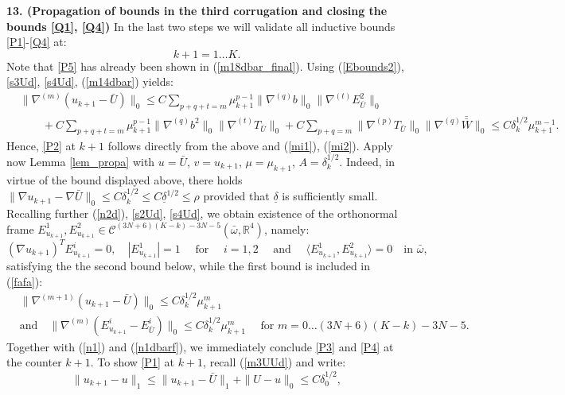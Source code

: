 \documentclass[reqno,twoside,11pt]{amsart}
\newcommand{\R}{\mathbb{R}}
\newcommand*{\dbar}[1]{\bar{\bar{#1}}}
\numberwithin{equation}{section}
\theoremstyle{plain}
\theoremstyle{definition}
\begin{document}
\smallskip

{\bf 13. (Propagation of bounds in the third corrugation and 
closing the bounds \ref{Q1}, \ref{Q4})}
In the last two steps we will validate all inductive
bounds \ref{P1}-\ref{Q4} at:
$$k+1=1\ldots K.$$
Note that \ref{P5} has already been shown in (\ref{m18dbar_final}).
Using (\ref{Ebounds2}), \ref{s3Ud}, \ref{s4Ud},
(\ref{m14dbar}) yields:
\begin{equation}\label{fafa}
\begin{split} 
& \|\nabla^{(m)} (u_{k+1}-\bar U)\|_0\leq C\sum_{p+q+t=m}\mu_{k+1}^{p-1}
\|\nabla^{(q)}b\|_0\|\nabla^{(t)}E^2_{\bar U}\|_0  \\ & \qquad +  C\sum_{p+q+t=m}\mu_{k+1}^{p-1}
\|\nabla^{(q)}b^2\|_0\|\nabla^{(t)}T_{\bar U}\|_0 + C\sum_{p+q=m}
\|\nabla^{(p)}T_{\bar U}\|_0 \|\nabla^{(q)}\dbar W\|_0 \leq C \delta_k^{1/2}\mu_{k+1}^{m-1}.
\end{split}
\end{equation}
Hence, \ref{P2} at $k+1$ follows directly
from the above and (\ref{mi1}), (\ref{mi2}).
Apply now Lemma \ref{lem_propa} with $u=\bar U$, $v=u_{k+1}$, $\mu=\mu_{k+1}$,
$A=\delta_k^{1/2}$. Indeed, in virtue of the bound displayed above,
there holds $\|\nabla
u_{k+1}-\nabla \bar U\|_0\leq C\delta_k^{1/2}\leq C{\underline\delta}^{1/2}\leq
\rho$ provided that $\underline\delta$ is sufficiently small. Recalling
further (\ref{n2d}), \ref{s2Ud}, \ref{s4Ud}, we obtain existence of
the orthonormal frame $E^1_{u_{k+1}},
E^2_{u_{k+1}}\in\mathcal{C}^{(3N+6)(K-k)-3N-5}(\bar\omega, \R^4)$, namely:
$$(\nabla u_{k+1})^TE^i_{u_{k+1}}=0,\quad |E^1_{u_{k+1}}|=1\quad\mbox{ for }\quad 
i=1,2\quad\mbox{ and } \quad \langle E^1_{u_{k+1}},
E^2_{u_{k+1}}\rangle=0\quad\mbox{in } \bar\omega,$$ 
satisfying the the second bound below, while the first bound is
included in (\ref{fafa}):
\begin{equation}\label{n1dbarf}
\begin{split}
& \|\nabla^{(m+1)}(u_{k+1}-\bar U)\|_0\leq C\delta_k^{1/2}\mu_{k+1}^{m}
\\ & \mbox{and}\quad \|\nabla^{(m)}(E^i_{u_{k+1}}-E^i_{\bar U})\|_0\leq C\delta_k^{1/2}\mu_{k+1}^{m}
\quad\mbox{ for } m=0\ldots (3N+6)(K-k)-3N-5.%
\end{split}
\end{equation}
Together with (\ref{n1}) and (\ref{n1dbarf}), we immediately conclude
\ref{P3} and \ref{P4} at the counter $k+1$.
To show \ref{P1} at $k+1$, recall (\ref{m3UUd}) and write:
\begin{equation}\label{m3UUdf}
\|u_{k+1}-u\|_1\leq \|u_{k+1} - \bar U\|_1 + \|U-u\|_0 \leq C\delta_0^{1/2},
\end{equation}
\end{document}
